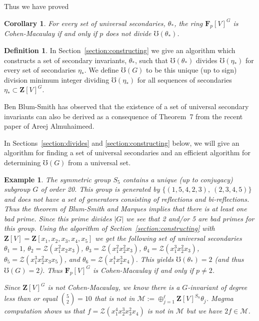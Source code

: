 \documentclass[12pt]{amsart}
\providecommand{\binom}[2]{{#1\choose#2}}
\newcommand{\ZZ}{\mathbf{Z}} %
\newcommand{\FF}{\mathbf{F}} %
\newcommand{\ZZ}{\mathbb{Z}} %
\newcommand{\FF}{\mathbb{F}} %
\newcommand{\Sn}{{S_n}}
\newtheorem{cor}[thm]{Corollary}
\newtheorem{example}[thm]{Example}
\theoremstyle{definition}
\newtheorem{definition}[thm]{Definition}
\newcommand{\calm}{\mathcal{M}}
\newcommand{\calz}{\mathcal{Z}}
\newcommand{\bth}{{{\theta_*}}} %
\begin{document}
Thus we have proved 
\begin{cor}
  For every set of universal secondaries, $\bth$, the ring
    $\FF_p[V]^G$ is Cohen-Macaulay if and only if $p$ does not divide $\mho(\bth)$.
\end{cor}
\begin{definition}
    In Section~\ref{section:constructing} we give an algorithm which constructs a set of secondary invariants, $\bth$, such that $\mho(\bth)$ divides $\mho(\eta_*)$ for every set of secondaries $\eta_*$.  We define $\mho(G)$ to be this unique (up to sign) division minimum integer
    dividing $\mho(\eta_*)$ for all sequences of secondaries $\eta_* \subset \ZZ[V]^G$.
\end{definition}
Ben Blum-Smith has observed that the existence of a set of universal secondary invariants 
  can also be derived as a consequence of Theorem~7 from the recent paper \cite{AA} of  Areej Almuhaimeed.

  In Sections~\ref{section:divides} and \ref{section:constructing} below, we will give an algorithm for finding a set of universal
 secondaries and an efficient algorithm for determining $\mho(G)$ from a universal set.

 \begin{example}\label{ex: group of order 20}
The symmetric group $S_5$ contains a unique (up to conjugacy) subgroup $G$ of order 20.   This group is generated by
$\{(1, 5, 4, 2, 3),~(2, 3, 4, 5)\}$ and does not have a set of generators consisting of reflections and bi-reflections.  Thus the theorem of Blum-Smith and Marques implies that there is at least one bad prime.  Since this prime divides $|G|$ we see that 2 and/or 5 are bad primes for this group.  Using the algorithm of Section~\ref{section:constructing} with $\ZZ[V]=\ZZ[x_1,x_2,x_3,x_4,x_5]$ we get the following set of universal secondaries
$\theta_1=1$,
$\theta_2=\calz(x_1^2 x_2 x_3)$, 
$\theta_3=\calz(x_1^2 x_2^2 x_3)$, 
$\theta_4=\calz(x_1^3 x_2^2 x_3)$, 
$\theta_5=\calz(x_1^3 x_2^2 x_3 x_5)$, and
$\theta_6=\calz(x_1^4 x_2^3 x_4)$. 
This yields $\mho(\bth)=2$ (and thus $\mho(G)=2$). 
Thus $\FF_p[V]^G$ is Cohen-Macaulay if and 
only if $p\neq 2$.

Since $\ZZ[V]^G$ is not Cohen-Macaulay, we know there is a $G$-invariant of degree less than or equal $\binom{5}{2}=10$ that is not in $\calm:=\oplus_{j=1}^\ell \ZZ[V]^{\Sn}\theta_j$.  Magma computation shows us that $f = \calz(x_1^4 x_2^3 x_3^2x_4)$ is not in $\calm$ but we have $2f \in \calm$.  
\end{example}
 
\end{document}
